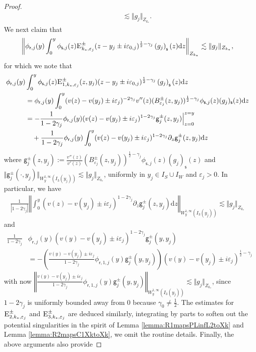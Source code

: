 \documentclass[11pt,reqno]{amsproc}
\theoremstyle{definition}
\numberwithin{equation}{section}
\newcommand{\sr}{{\mathsf{r}}}
\newcommand{\s}{{\mathsf{s}}}
\renewcommand{\d}{\mathrm{d}}
\newcommand{\ep}{\varepsilon}
\begin{document}
\begin{proof}
\begin{align*}
&\qquad\lesssim \Vert g_j \Vert_{Z_{k_*}}.
\end{align*}
We next claim that 
\begin{align*}
\left\Vert  \phi_{\sr,j}(y)\int_0^y \phi_{\s,j}(z) \textsc{E}_{k_*,\ep_j}^\pm (z-y_j \pm i\ep_{0,j} )^{\frac12-\gamma_j} \left(g_j \right)_\s (z) \d z \right\Vert_{Z_{k_*}}  \lesssim \Vert g_j \Vert_{Z_{k_*}},
\end{align*}
for which we note that
\begin{align*}
\phi_{\sr,j}(y) &\int_0^y \phi_{\s,j}(z) \textsc{E}_{1,k_*,\ep_j}^\pm(z,y_j) (z-y_j \pm i\ep_{0,j})^{\frac12-\gamma_j} \left( g_j \right)_\s(z) \d z \\
&= \phi_{\sr,j}(y) \int_0^y (v(z) - v(y_j) \pm i\ep_j)^{-2\gamma_j} v''(z) (B_{\ep_j}^\pm(z,y_j))^{\frac12-\gamma_j} \phi_{\s,j}(z)(g_j)_\s(z) \d z \\
&= -\frac{1}{1-2\gamma_j}\phi_{\sr,j}(y) (v(z) - v(y_j) \pm i\ep_j)^{1-2\gamma_j} \mathsf{g}_j^\pm(z,y_j) \Big|_{z=0}^{z=y} \\
&\quad + \frac{1}{1-2\gamma_j}\phi_{\sr,j}(y)\int_0^y (v(z) - v(y_j) \pm i\ep_j)^{1-2\gamma_j} \partial_z \mathsf{g}_j^\pm(z,y_j) \d z
\end{align*}
where $\mathsf{g}_j^\pm(z,y_j):= \frac{v''(z)}{v'(z)}(B_{\ep_j}^\pm(z,y_j))^{\frac12-\gamma_j} \phi_{\s,j}(z)(g_j)_\s(z)$ and $\Vert \mathsf{g}_j^\pm(\cdot,y_j)\Vert_{W^{1,\infty}_y(I_3(y_j))}\lesssim \Vert g_j \Vert_{Z_{k_*}}$, uniformly in $y_j\in I_S\cup I_W$ and $\ep_j>0$. In particular, we have
\begin{align*}
\frac{1}{|1-2\gamma_j|}\left \Vert \int_0^y (v(z) - v(y_j) \pm i\ep_j)^{1-2\gamma_j} \partial_z \mathsf{g}_j^\pm(z,y_j) \d z \right\Vert_{W^{1,\infty}_y(I_3(y_j))}\lesssim \Vert g_j \Vert_{Z_{k_*}}
\end{align*}
and
\begin{align*}
\frac{1}{1-2\gamma_j}&\phi_{\sr,j}(y) (v(y) - v(y_j) \pm i\ep_j)^{1-2\gamma_j} \mathsf{g}_j^\pm(y,y_j) \\
&= -\left( \frac{v(y) - v(y_j) \pm i\ep_j}{1-2\gamma_j}\phi_{\sr,1,j}(y)\mathsf{g}_j^\pm(y,y_j)  \right) (v(y) - v(y_j)\pm i\ep_j)^{\frac12-\gamma_j}
\end{align*}
with now $\left \Vert \frac{v(y) - v(y_j) \pm i\ep_j}{1-2\gamma_j}\phi_{\sr,1,j}(y)\mathsf{g}_j^\pm(y,y_j)  \right\Vert_{W^{1,\infty}_y(I_3(y_j))}\lesssim \Vert g_j \Vert_{Z_{k_*}}$, since $1-2\gamma_j$ is uniformly bounded away from 0 because $\gamma_0\neq \frac12$. The estimates for $\textsc{E}_{2,k_*,\ep_j}^\pm$ and $\textsc{E}_{3,k_*,\ep_j}^\pm$ are deduced similarly, integrating by parts to soften out the potential singularities in the spirit of Lemma \ref{lemma:R1mapsPLinfL2toXk} and Lemma \ref{lemma:R2mapsC1XktoXk}, we omit the routine details. Finally, the above arguments also provide

\end{proof}
\end{document}

